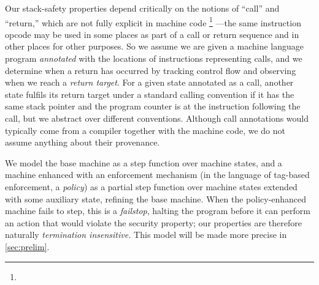 \documentclass[acmsmall,review,anonymous]{acmart}\settopmatter{printfolios=true,printccs=false,printacmref=false}
\begin{document}
Our stack-safety properties depend
critically on the notions of ``call'' and ``return,'' which are not fully explicit
in machine code%
%
\footnote{}%
%
---the same instruction opcode may be used in some places as part of
a call or return sequence and in other places for other purposes.
%
So we assume we are given a machine language program {\em annotated} with the locations of
instructions representing calls, and we determine when a return has occurred by tracking
control flow and observing when we reach a {\em return target}. For a given state annotated
as a call, another state fulfils its return target under a standard calling convention if
it has the same stack pointer and the program counter is at the instruction following
the call, but we abstract over different conventions.
Although call annotations would typically come from a compiler together with
the machine code, we do not assume anything about their provenance.

We model the base machine as a step function over machine states, and a machine
enhanced with an enforcement mechanism (in the language of tag-based enforcement,
a {\em policy}) as a partial step function over machine states extended with some
auxiliary state, refining the base machine. When the policy-enhanced machine fails
to step, this is a {\em failstop}, halting the program before it can perform an
action that would violate the security property;
our properties are therefore naturally \emph{termination insensitive.}
This model will be made more precise in \cref{sec:prelim}.
\end{document}
